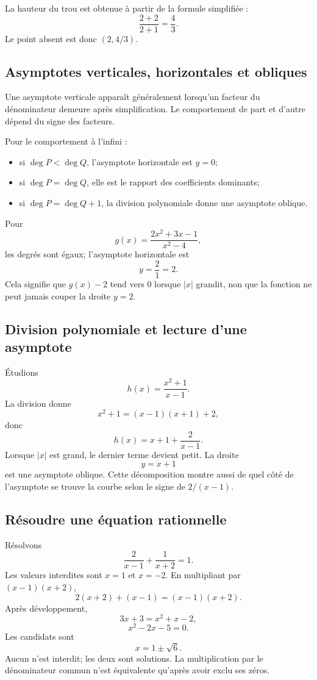 \documentclass[12pt,a4paper,openany]{book}
\newcommand{\abs}[1]{\left\lvert #1\right\rvert}
\begin{document}
La hauteur du trou est obtenue à partir de la formule simplifiée :
\[
\frac{2+2}{2+1}=\frac43.
\]
Le point absent est donc $(2,4/3)$.

\subsection{Asymptotes verticales, horizontales et obliques}

Une asymptote verticale apparaît généralement lorsqu'un facteur du dénominateur demeure après simplification. Le comportement de part et d'autre dépend du signe des facteurs.

Pour le comportement à l'infini :
\begin{itemize}
\item si $\deg P<\deg Q$, l'asymptote horizontale est $y=0$;
\item si $\deg P=\deg Q$, elle est le rapport des coefficients dominants;
\item si $\deg P=\deg Q+1$, la division polynomiale donne une asymptote oblique.
\end{itemize}

\begin{examplebox}
Pour
\[
g(x)=\frac{2x^2+3x-1}{x^2-4},
\]
les degrés sont égaux; l'asymptote horizontale est
\[
y=\frac21=2.
\]
Cela signifie que $g(x)-2$ tend vers $0$ lorsque $\abs x$ grandit, non que la fonction ne peut jamais couper la droite $y=2$.
\end{examplebox}

\subsection{Division polynomiale et lecture d'une asymptote}

Étudions
\[
h(x)=\frac{x^2+1}{x-1}.
\]
La division donne
\[
x^2+1=(x-1)(x+1)+2,
\]
donc
\[
h(x)=x+1+\frac{2}{x-1}.
\]
Lorsque $\abs x$ est grand, le dernier terme devient petit. La droite
\[
y=x+1
\]
est une asymptote oblique. Cette décomposition montre aussi de quel côté de l'asymptote se trouve la courbe selon le signe de $2/(x-1)$.

\subsection{Résoudre une équation rationnelle}

Résolvons
\[
\frac{2}{x-1}+\frac{1}{x+2}=1.
\]
Les valeurs interdites sont $x=1$ et $x=-2$. En multipliant par $(x-1)(x+2)$,
\[
2(x+2)+(x-1)=(x-1)(x+2).
\]
Après développement,
\[
3x+3=x^2+x-2,
\]
\[
x^2-2x-5=0.
\]
Les candidats sont
\[
x=1\pm\sqrt6.
\]
Aucun n'est interdit; les deux sont solutions. La multiplication par le dénominateur commun n'est équivalente qu'après avoir exclu ses zéros.
\end{document}
